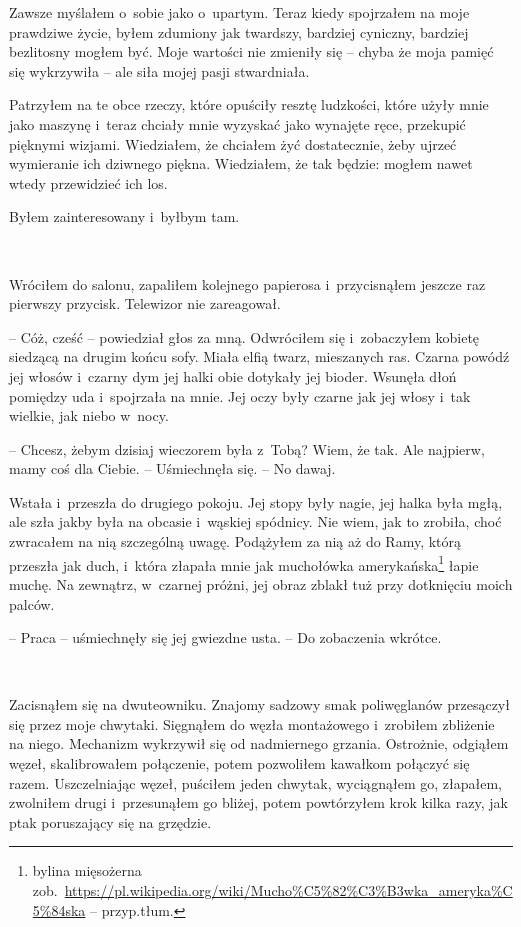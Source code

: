 \documentclass[oneside,polish,11pt,sfheadings]{mwbk}
\begin{document}
Zawsze myślałem o~sobie jako o~upartym. Teraz kiedy spojrzałem na moje
prawdziwe życie, byłem zdumiony jak twardszy, bardziej cyniczny,
bardziej bezlitosny mogłem być. Moje wartości nie zmieniły się -- chyba
że moja pamięć się wykrzywiła -- ale siła mojej pasji stwardniała.

Patrzyłem na te obce rzeczy, które opuściły resztę ludzkości, które
użyły mnie jako maszynę i~teraz chciały mnie wyzyskać jako wynajęte
ręce, przekupić pięknymi wizjami. Wiedziałem, że chciałem żyć
dostatecznie, żeby ujrzeć wymieranie ich dziwnego piękna. Wiedziałem, że
tak będzie: mogłem nawet wtedy przewidzieć ich los.

Byłem zainteresowany i~byłbym tam.

~

Wróciłem do salonu, zapaliłem kolejnego papierosa i~przycisnąłem jeszcze
raz pierwszy przycisk. Telewizor nie zareagował.

-- Cóż, cześć -- powiedział głos za mną. Odwróciłem się i~zobaczyłem
kobietę siedzącą na drugim końcu sofy. Miała elfią twarz, mieszanych
ras. Czarna powódź jej włosów i~czarny dym jej halki obie dotykały jej
bioder. Wsunęła dłoń pomiędzy uda i~spojrzała na mnie. Jej oczy były
czarne jak jej włosy i~tak wielkie, jak niebo w~nocy.

-- Chcesz, żebym dzisiaj wieczorem była z~Tobą? Wiem, że tak. Ale
najpierw, mamy coś dla Ciebie. -- Uśmiechnęła się. -- No dawaj.

Wstała i~przeszła do drugiego pokoju. Jej stopy były nagie, jej halka
była mgłą, ale szła jakby była na obcasie i~wąskiej spódnicy. Nie wiem,
jak to zrobiła, choć zwracałem na nią szczególną uwagę. Podążyłem za nią
aż do Ramy, którą przeszła jak duch, i~która złapała mnie jak muchołówka
amerykańska\footnote{bylina mięsożerna
zob.~\url{https://pl.wikipedia.org/wiki/Mucho\%C5\%82\%C3\%B3wka_ameryka\%C5\%84ska} -- przyp.tłum.} łapie muchę. Na zewnątrz, w~czarnej próżni, jej obraz
zblakł tuż przy dotknięciu moich palców.

-- Praca -- uśmiechnęły się jej gwiezdne usta. -- Do zobaczenia wkrótce.

~

Zacisnąłem się na dwuteowniku. Znajomy sadzowy smak poliwęglanów
przesączył się przez moje chwytaki. Sięgnąłem do węzła montażowego i~zrobiłem zbliżenie na niego. Mechanizm wykrzywił się od nadmiernego
grzania. Ostrożnie, odgiąłem węzeł, skalibrowałem połączenie, potem
pozwoliłem kawałkom połączyć się razem. Uszczelniając węzeł, puściłem
jeden chwytak, wyciągnąłem go, złapałem, zwolniłem drugi i~przesunąłem
go bliżej, potem powtórzyłem krok kilka razy, jak ptak poruszający się
na grzędzie.
\end{document}

